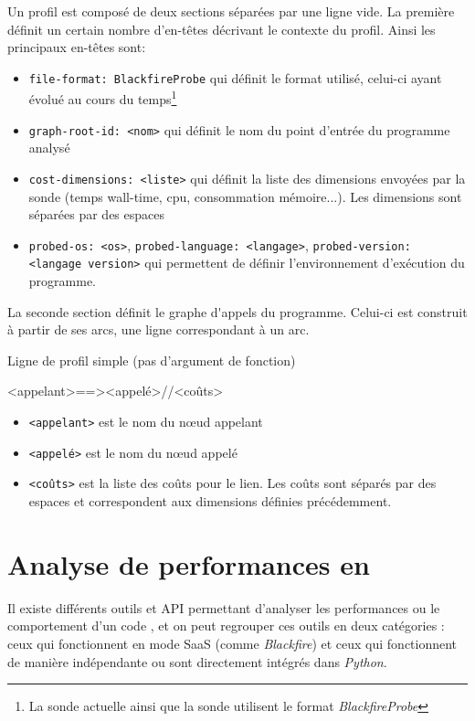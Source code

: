 Un profil est composé de deux sections séparées par une ligne vide. La première définit un certain nombre d'en-têtes décrivant le contexte du profil. Ainsi les principaux en-têtes sont:
\begin{itemize}
\item \verb|file-format: BlackfireProbe| qui définit le format utilisé, celui-ci ayant évolué au cours du temps\footnote{La sonde \PHP actuelle ainsi que la sonde \Python utilisent le format \emph{BlackfireProbe}}
\item \verb|graph-root-id: <nom>| qui définit le nom du point d'entrée du programme analysé
\item \verb|cost-dimensions: <liste>| qui définit la liste des dimensions envoyées par la sonde (temps wall-time, cpu, consommation mémoire...). Les dimensions sont séparées par des espaces
\item \verb|probed-os: <os>|, \verb|probed-language: <langage>|, \verb|probed-version: <langage version>| qui permettent de définir l'environnement d'exécution du programme.
\end{itemize}

La seconde section définit le \gls{graphe d'appels} du programme. Celui-ci est construit à partir de ses arcs, une ligne correspondant à un arc.

\begin{listing}[H]
\caption{Ligne de profil simple (pas d'argument de fonction)}
\begin{textcode}
<appelant>==><appelé>//<coûts>
\end{textcode}
\end{listing}

\begin{itemize}
\item \verb|<appelant>| est le nom du nœud appelant
\item \verb|<appelé>| est le nom du nœud appelé
\item \verb|<coûts>| est la liste des coûts pour le lien. Les coûts sont séparés par des espaces et correspondent aux dimensions définies précédemment.
\end{itemize}

	\chapter[Analyse en \Python]{Analyse de performances en \Python}
Il existe différents outils et API permettant d'analyser les performances ou le comportement d'un code \Python, et on peut regrouper ces outils en deux catégories : ceux qui fonctionnent en mode \gls{SaaS} (comme \emph{Blackfire}) et ceux qui fonctionnent de manière indépendante ou sont directement intégrés dans \emph{Python}.

